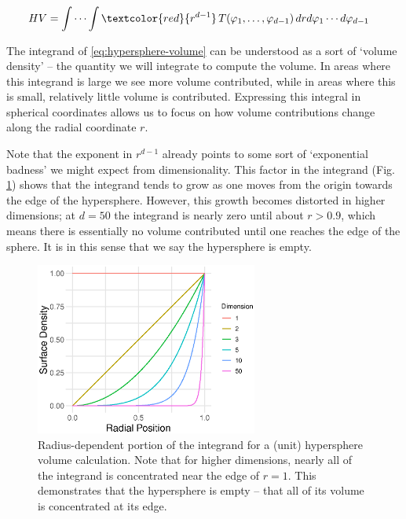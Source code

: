\documentclass{article}
\begin{document}
\begin{equation*} \begin{aligned} \label{eq:hypersphere-volume}
    HV &= \int\cdots\int \textcolor{red}{r^{d-1}}\,
         T(\varphi_{1},\dots,\varphi_{d-1})\,
         dr d\varphi_{1}\cdots d\varphi_{d-1}
\end{aligned} \end{equation*}

\noindent The integrand of \eqref{eq:hypersphere-volume} can be understood as a
sort of `volume density' -- the quantity we will integrate to compute the
volume. In areas where this integrand is large we see more volume contributed,
while in areas where this is small, relatively little volume is contributed.
Expressing this integral in spherical coordinates allows us to focus on how
volume contributions change along the radial coordinate $r$.

Note that the exponent in $r^{d-1}$ already points to some sort of `exponential
badness' we might expect from dimensionality. This factor in the integrand (Fig.
\ref{fig:hypervolume}) shows that the integrand tends to grow as one moves from
the origin towards the edge of the hypersphere. However, this growth becomes
distorted in higher dimensions; at $d=50$ the integrand is nearly zero until
about $r>0.9$, which means there is essentially no volume contributed until one
reaches the edge of the sphere. It is in this sense that we say the hypersphere
is empty.

\begin{figure}[!ht]
  \centering
  \includegraphics[width=0.65\textwidth]{../../images/surface_density}
  \caption{Radius-dependent portion of the integrand for a (unit) hypersphere
    volume calculation. Note that for higher dimensions, nearly all of the
    integrand is concentrated near the edge of $r=1$. This demonstrates that the
    hypersphere is empty -- that all of its volume is concentrated at its edge.}
  \label{fig:hypervolume}
\end{figure}
\end{document}
